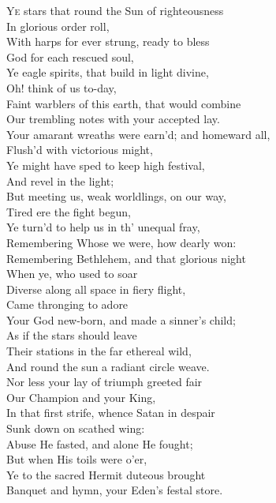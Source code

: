 \textsc{Ye} stars that round the Sun of righteousness \\
 In glorious order roll, \\
 With harps for ever strung, ready to bless \\
 God for each rescued soul, \\
 Ye eagle spirits, that build in light divine, \\
 Oh! think of us to-day, \\
 Faint warblers of this earth, that would combine \\
 Our trembling notes with your accepted lay. \\
  Your amarant wreaths were earn’d; and homeward all, \\
 Flush’d with victorious might, \\
 Ye might have sped to keep high festival, \\
 And revel in the light; \\
 But meeting us, weak worldlings, on our way, \\
 Tired ere the fight begun, \\
 Ye turn’d to help us in th’ unequal fray, \\
 Remembering Whose we were, how dearly won: \\
  Remembering Bethlehem, and that glorious night \\
 When ye, who used to soar \\
 Diverse along all space in fiery flight, \\
 Came thronging to adore \\
 Your God new-born, and made a sinner’s child; \\
 As if the stars should leave \\
 Their stations in the far ethereal wild, \\
 And round the sun a radiant circle weave. \\
  Nor less your lay of triumph greeted fair \\
 Our Champion and your King, \\
 In that first strife, whence Satan in despair \\
 Sunk down on scathed wing: \\
 Abuse He fasted, and alone He fought; \\
 But when His toils were o’er, \\
 Ye to the sacred Hermit duteous brought \\
 Banquet and hymn, your Eden’s festal store. \\
